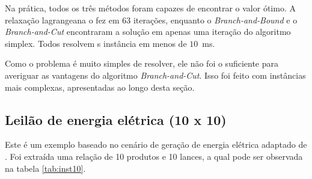 \documentclass{article}
\begin{document}
	    Na prática, todos os três métodos foram capazes de encontrar o valor ótimo. A relaxação lagrangeana o fez em 63 iterações, enquanto o \emph{Branch-and-Bound} e o \emph{Branch-and-Cut} encontraram a solução em apenas uma iteração do algoritmo simplex. Todos resolvem s instância em menos de $10$~ms.
	    
	    Como o problema é muito simples de resolver, ele não foi o suficiente para averiguar as vantagens do algoritmo \emph{Branch-and-Cut}. Isso foi feito com instâncias mais complexas, apresentadas ao longo desta seção.
	    
	    
	    
    \subsection{Leilão de energia elétrica (10 x 10)}
    
    Este é um exemplo baseado no cenário de geração de energia elétrica adaptado de \cite{Elisa}. Foi extraída uma relação de 10 produtos e 10 lances, a qual pode ser observada na tabela \ref{tab:inst10}.
    
\end{document}
